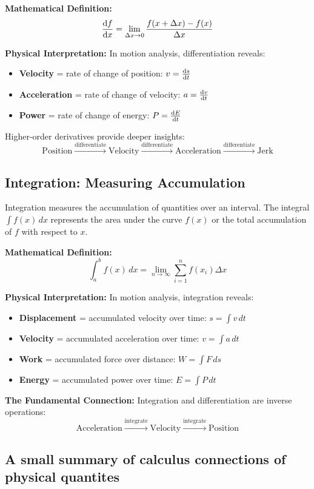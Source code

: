 \documentclass[11pt,a4paper]{article}
\begin{document}
\textbf{Mathematical Definition:}
\[
\dv{f}{x} = \lim_{\Delta x \to 0} \frac{f(x + \Delta x) - f(x)}{\Delta x}
\]

\textbf{Physical Interpretation:} In motion analysis, differentiation reveals:
\begin{itemize}
\item \textbf{Velocity} = rate of change of position: $v = \dv{s}{t}$
\item \textbf{Acceleration} = rate of change of velocity: $a = \dv{v}{t}$
\item \textbf{Power} = rate of change of energy: $P = \dv{E}{t}$
\end{itemize}

Higher-order derivatives provide deeper insights:
\[
\text{Position} \xrightarrow{\text{differentiate}} \text{Velocity} \xrightarrow{\text{differentiate}} \text{Acceleration} \xrightarrow{\text{differentiate}} \text{Jerk}
\]

\subsection*{Integration: Measuring Accumulation}
Integration measures the accumulation of quantities over an interval. The integral $\int f(x) \, dx$ represents the area under the curve $f(x)$ or the total accumulation of $f$ with respect to $x$.

\textbf{Mathematical Definition:}
\[
\int_a^b f(x) \, dx = \lim_{n \to \infty} \sum_{i=1}^n f(x_i) \Delta x
\]

\textbf{Physical Interpretation:} In motion analysis, integration reveals:
\begin{itemize}
\item \textbf{Displacement} = accumulated velocity over time: $s = \int v \, dt$
\item \textbf{Velocity} = accumulated acceleration over time: $v = \int a \, dt$
\item \textbf{Work} = accumulated force over distance: $W = \int F \, ds$
\item \textbf{Energy} = accumulated power over time: $E = \int P \, dt$
\end{itemize}

\textbf{The Fundamental Connection:} Integration and differentiation are inverse operations:
\[
\text{Acceleration} \xrightarrow{\text{integrate}} \text{Velocity} \xrightarrow{\text{integrate}} \text{Position}
\]

\subsection*{A small summary of calculus connections of physical quantites}
\end{document}
